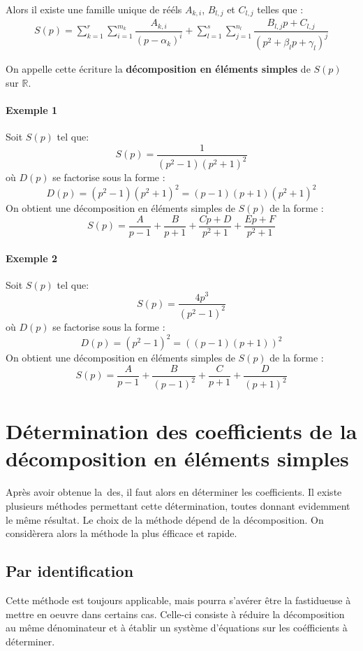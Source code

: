 Alors il existe une famille unique de rééls $A_{k,i}$, $B_{l,j}$ et $C_{l,j}$ telles que :
\begin{align}
S(p)=\sum_{k=1}^r\sum_{i=1}^{m_k} \dfrac{A_{k,i}}{\left(p-\alpha_k\right)^i}+\sum_{l=1}^s\sum_{j=1}^{n_l} \dfrac{B_{l,j}p+C_{l,j}}{\left(p^2+\beta_lp+\gamma_l\right)^j}
\end{align}

On appelle cette écriture la \textbf{décomposition en éléments simples} de $S(p)$ sur $\mathbb{R}$.

\paragraph{Exemple 1}
Soit $S(p)$ tel que:
$$
S(p)=\dfrac{1}{(p^2-1)(p^2+1)^2}
$$
où $D(p)$ se factorise sous la forme :
$$
D(p)=(p^2-1)(p^2+1)^2=(p-1)(p+1)(p^2+1)^2
$$
On obtient une décomposition en éléments simples de $S(p)$ de la forme :
$$
S(p)=\dfrac{A}{p-1}+\dfrac{B}{p+1}+\dfrac{Cp+D}{p^2+1}+\dfrac{Ep+F}{p^2+1}
$$

\paragraph{Exemple 2}
Soit $S(p)$ tel que:
$$
S(p)=\dfrac{4p^3}{(p^2-1)^2}
$$
où $D(p)$ se factorise sous la forme :
$$
D(p)=(p^2-1)^2=\left((p-1)(p+1)\right)^2
$$
On obtient une décomposition en éléments simples de $S(p)$ de la forme :
$$
S(p)=\dfrac{A}{p-1}+\dfrac{B}{(p-1)^2}+\dfrac{C}{p+1}+\dfrac{D}{(p+1)^2}
$$
\section[Détermination des coefficients de la DES]{Détermination des coefficients de la décomposition en éléments simples}
Après avoir obtenue la~\gls{des}, il faut alors en déterminer les coefficients. Il existe plusieurs
méthodes permettant cette détermination, toutes donnant evidemment le même résultat. Le choix 
de la méthode dépend de la décomposition. On considèrera alors la méthode la plus éfficace et rapide.

\subsection{Par identification}
Cette méthode est toujours applicable, mais pourra s'avérer être la fastidueuse
à mettre en oeuvre dans certains cas.
Celle-ci consiste à réduire la décomposition au même dénominateur et à établir
un système d'équations sur les coéfficients à déterminer.

